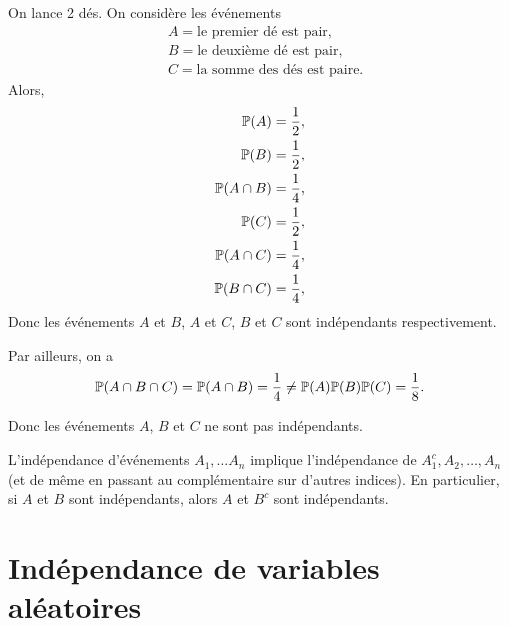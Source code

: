 \begin{example}
    On lance 2 dés. On considère les événements
    \begin{equation*}
        \begin{aligned}
            &A = \text{le premier dé est pair},\\
            &B = \text{le deuxième dé est pair},\\
            &C = \text{la somme des dés est paire}.
        \end{aligned}
    \end{equation*}
    Alors, 
    \begin{equation*}
        \begin{aligned}
            \mathbb{P}(A) &= \frac{1}{2},\\
            \mathbb{P}(B) &= \frac{1}{2},\\
            \mathbb{P}(A\cap B) &= \frac{1}{4},\\
            \mathbb{P}(C) &= \frac{1}{2},\\
            \mathbb{P}(A\cap C) &= \frac{1}{4},\\
            \mathbb{P}(B\cap C) &= \frac{1}{4},\\
        \end{aligned}
    \end{equation*}
    Donc les événements \(A\) et \(B\), \(A\) et \(C\), \(B\) et \(C\) sont indépendants respectivement.

    Par ailleurs, on a
    \begin{equation*}
        \mathbb{P}(A\cap B\cap C) = \mathbb{P}(A\cap B) = \frac{1}{4} \neq \mathbb{P}(A)\mathbb{P}(B)\mathbb{P}(C) = \frac{1}{8}.
    \end{equation*}

    Donc les événements \(A\), \(B\) et \(C\) ne sont pas indépendants.
\end{example}

\begin{remark}
    L'indépendance d'événements \(A_1,\ldots A_n\) implique l'indépendance
    de \(A_1^c,A_2,\ldots,A_n\) (et de même en passant au complémentaire 
    sur d'autres indices). En particulier, si \(A\) et \(B\) sont indépendants,
    alors \(A\) et \(B^c\) sont indépendants.
\end{remark}

\section{Indépendance de variables aléatoires} %

